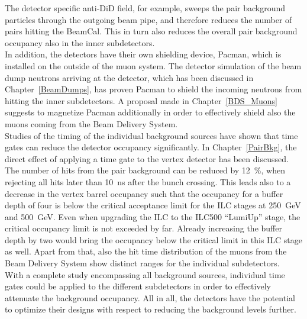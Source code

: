 The detector specific anti-DiD field, for example, sweeps the pair background particles through the outgoing beam pipe, and therefore reduces the number of pairs hitting the \sid BeamCal.
This in turn also reduces the overall pair background occupancy also in the inner subdetectors.
\\In addition, the detectors have their own shielding device, Pacman, which is installed on the outside of the muon system.
The detector simulation of the beam dump neutrons arriving at the \sid detector, which has been discussed in Chapter~\ref{BeamDumps}, has proven Pacman to shield the incoming neutrons from hitting the inner subdetectors.
A proposal made in Chapter~\ref{BDS_Muons} suggests to magnetize Pacman additionally in order to effectively shield also the muons coming from the Beam Delivery System.
\\Studies of the timing of the individual background sources have shown that time gates can reduce the detector occupancy significantly.
In Chapter~\ref{PairBkg}, the direct effect of applying a time gate to the \sid vertex detector has been discussed.
The number of hits from the pair background can be reduced by \SI{12}{\percent}, when rejecting all hits later than \SI{10}{\nano\second} after the bunch crossing.
This leads also to a decrease in the vertex barrel occupancy such that the occupancy for a buffer depth of four is below the critical acceptance limit for the ILC stages at \SI{250}{\GeV} and \SI{500}{\GeV}. 
Even when upgrading the ILC to the ILC500 ``LumiUp'' stage, the critical occupancy limit is not exceeded by far.
Already increasing the buffer depth by two would bring the occupancy below the critical limit in this ILC stage as well.
Apart from that, also the hit time distribution of the muons from the Beam Delivery System show distinct ranges for the individual \sid subdetectors.
\\With a complete study encompassing all background sources, individual time gates could be applied to the different \sid subdetectors in order to effectively attenuate the background occupancy.
All in all, the detectors have the potential to optimize their designs with respect to reducing the background levels further.